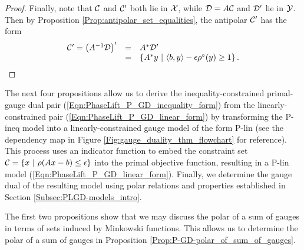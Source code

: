 \begin{proof}
Finally, note that ${\mathcal C}$ and ${\mathcal C}'$ both lie in ${\mathcal X}$, while ${\mathcal D} = A{\mathcal C}$ and ${\mathcal D}'$ lie in ${\mathcal Y}$.  Then by Proposition \ref{Prop:antipolar_set_equalities}, the antipolar ${\mathcal C}'$ has the form
\begin{equation}
\begin{array}{lll}
\caC' = \left(A^{-1} \caD \right)'	& =  &	A^* \caD' 	\\
	&	=	&		\left\{ A^*y 	\	|	\ \langle b, y \rangle - \epsilon \rho^\circ(y) \geq 1  \right\}.
\end{array}
\end{equation}
\end{proof}





The next four propositions allow us to derive the inequality-constrained primal-gauge dual pair (\ref{Eqn:PhaseLift_P_GD_inequality_form}) from the linearly-constrained pair (\ref{Eqn:PhaseLift_P_GD_linear_form}) by transforming the P-ineq model into a linearly-constrained gauge model of the form P-lin (see the dependency map in Figure \ref{Fig:gauge_duality_thm_flowchart} for reference).   
This process uses an indicator function to embed the constraint set ${\mathcal C} = \{ x \ | \ \rho(Ax-b) \leq \epsilon\}$ into the primal objective function, resulting in a P-lin model (\ref{Eqn:PhaseLift_P_GD_linear_form}).  Finally, we determine the gauge dual of the resulting model using polar relations and properties established in Section \ref{Subsec:PLGD-models_intro}.


The first two propositions show that we may discuss the polar of a sum of gauges in terms of sets induced by Minkowski functions.  This allows us to determine the polar of a sum of gauges in Proposition \ref{Prop:P-GD-polar_of_sum_of_gauges}.

